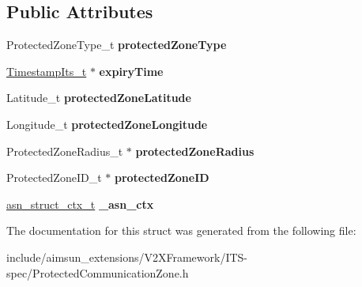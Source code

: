 \subsection*{Public Attributes}
\begin{DoxyCompactItemize}
\item 
Protected\+Zone\+Type\+\_\+t {\bfseries protected\+Zone\+Type}\hypertarget{structProtectedCommunicationZone_a5e292b8015aa7fc4960188b8a3c4b2d1}{}\label{structProtectedCommunicationZone_a5e292b8015aa7fc4960188b8a3c4b2d1}

\item 
\hyperlink{structASN____PRIMITIVE__TYPE__s}{Timestamp\+Its\+\_\+t} $\ast$ {\bfseries expiry\+Time}\hypertarget{structProtectedCommunicationZone_a2f4df1b1dc40b9b2d76ab378b101dc3b}{}\label{structProtectedCommunicationZone_a2f4df1b1dc40b9b2d76ab378b101dc3b}

\item 
Latitude\+\_\+t {\bfseries protected\+Zone\+Latitude}\hypertarget{structProtectedCommunicationZone_a30e36df44b2603472499293e3932af6e}{}\label{structProtectedCommunicationZone_a30e36df44b2603472499293e3932af6e}

\item 
Longitude\+\_\+t {\bfseries protected\+Zone\+Longitude}\hypertarget{structProtectedCommunicationZone_a020ca710b080981da2d9500032c41f1e}{}\label{structProtectedCommunicationZone_a020ca710b080981da2d9500032c41f1e}

\item 
Protected\+Zone\+Radius\+\_\+t $\ast$ {\bfseries protected\+Zone\+Radius}\hypertarget{structProtectedCommunicationZone_ad7dd231cc3a8e5b3b4eb2f8b365a4d02}{}\label{structProtectedCommunicationZone_ad7dd231cc3a8e5b3b4eb2f8b365a4d02}

\item 
Protected\+Zone\+I\+D\+\_\+t $\ast$ {\bfseries protected\+Zone\+ID}\hypertarget{structProtectedCommunicationZone_a041cb4dc234d455538850bfa6c0aa63b}{}\label{structProtectedCommunicationZone_a041cb4dc234d455538850bfa6c0aa63b}

\item 
\hyperlink{structasn__struct__ctx__s}{asn\+\_\+struct\+\_\+ctx\+\_\+t} {\bfseries \+\_\+asn\+\_\+ctx}\hypertarget{structProtectedCommunicationZone_ad066d7eb05796ee02fb70a64d9f8870a}{}\label{structProtectedCommunicationZone_ad066d7eb05796ee02fb70a64d9f8870a}

\end{DoxyCompactItemize}


The documentation for this struct was generated from the following file\+:\begin{DoxyCompactItemize}
\item 
include/aimsun\+\_\+extensions/\+V2\+X\+Framework/\+I\+T\+S-\/spec/Protected\+Communication\+Zone.\+h\end{DoxyCompactItemize}
